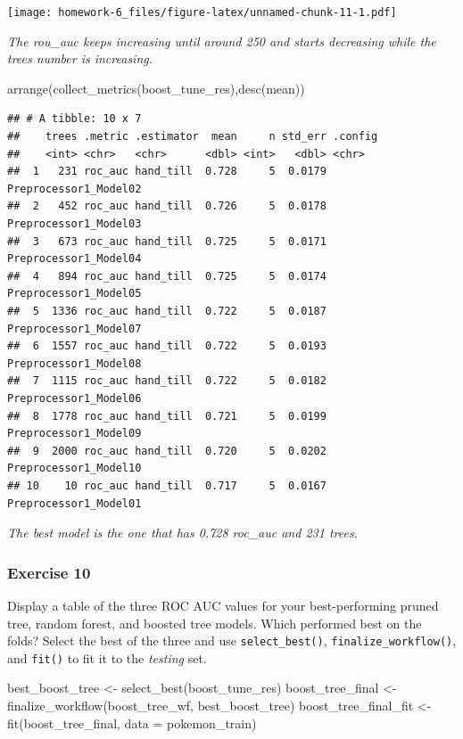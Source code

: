 \documentclass[
]{article}
\newenvironment{Shaded}{\begin{snugshade}}{\end{snugshade}}
\newcommand{\AttributeTok}[1]{\textcolor[rgb]{0.77,0.63,0.00}{#1}}
\newcommand{\FunctionTok}[1]{\textcolor[rgb]{0.00,0.00,0.00}{#1}}
\newcommand{\NormalTok}[1]{#1}
\newcommand{\OtherTok}[1]{\textcolor[rgb]{0.56,0.35,0.01}{#1}}
\begin{document}
\texttt{[image: homework-6\_files/figure-latex/unnamed-chunk-11-1.pdf]}

\emph{The rou\_auc keeps increasing until around 250 and starts
decreasing while the trees number is increasing.}

\begin{Shaded}
\begin{Highlighting}[]
\FunctionTok{arrange}\NormalTok{(}\FunctionTok{collect\_metrics}\NormalTok{(boost\_tune\_res),}\FunctionTok{desc}\NormalTok{(mean))}
\end{Highlighting}
\end{Shaded}

\begin{verbatim}
## # A tibble: 10 x 7
##    trees .metric .estimator  mean     n std_err .config              
##    <int> <chr>   <chr>      <dbl> <int>   <dbl> <chr>                
##  1   231 roc_auc hand_till  0.728     5  0.0179 Preprocessor1_Model02
##  2   452 roc_auc hand_till  0.726     5  0.0178 Preprocessor1_Model03
##  3   673 roc_auc hand_till  0.725     5  0.0171 Preprocessor1_Model04
##  4   894 roc_auc hand_till  0.725     5  0.0174 Preprocessor1_Model05
##  5  1336 roc_auc hand_till  0.722     5  0.0187 Preprocessor1_Model07
##  6  1557 roc_auc hand_till  0.722     5  0.0193 Preprocessor1_Model08
##  7  1115 roc_auc hand_till  0.722     5  0.0182 Preprocessor1_Model06
##  8  1778 roc_auc hand_till  0.721     5  0.0199 Preprocessor1_Model09
##  9  2000 roc_auc hand_till  0.720     5  0.0202 Preprocessor1_Model10
## 10    10 roc_auc hand_till  0.717     5  0.0167 Preprocessor1_Model01
\end{verbatim}

\emph{The best model is the one that has 0.728 roc\_auc and 231 trees.}

\hypertarget{exercise-10}{%
\subsubsection{Exercise 10}\label{exercise-10}}

Display a table of the three ROC AUC values for your best-performing
pruned tree, random forest, and boosted tree models. Which performed
best on the folds? Select the best of the three and use
\texttt{select\_best()}, \texttt{finalize\_workflow()}, and
\texttt{fit()} to fit it to the \emph{testing} set.

\begin{Shaded}
\begin{Highlighting}[]
\NormalTok{best\_boost\_tree }\OtherTok{\textless{}{-}} \FunctionTok{select\_best}\NormalTok{(boost\_tune\_res)}
\NormalTok{boost\_tree\_final }\OtherTok{\textless{}{-}} \FunctionTok{finalize\_workflow}\NormalTok{(boost\_tree\_wf, best\_boost\_tree)}
\NormalTok{boost\_tree\_final\_fit }\OtherTok{\textless{}{-}} \FunctionTok{fit}\NormalTok{(boost\_tree\_final, }\AttributeTok{data =}\NormalTok{ pokemon\_train)}
\end{Highlighting}
\end{Shaded}
\end{document}

